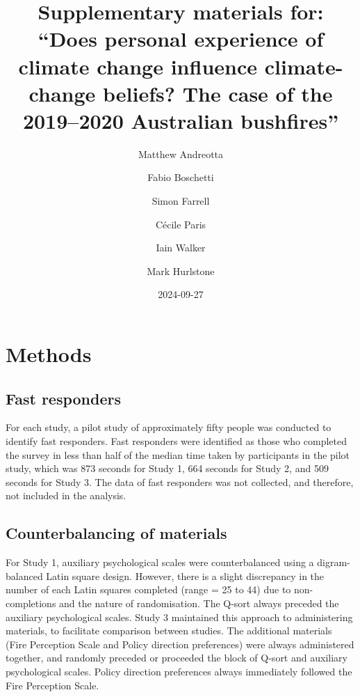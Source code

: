 \documentclass[
  letterpaper,
  DIV=11,
  numbers=noendperiod]{scrartcl}
\title{Supplementary materials for: ``Does personal experience of
climate change influence climate-change beliefs? The case of the
2019--2020 Australian bushfires''}
\author{Matthew Andreotta \and Fabio Boschetti \and Simon
Farrell \and Cécile Paris \and Iain Walker \and Mark Hurlstone}
\date{2024-09-27}
\begin{document}
\maketitle
\ifdefined\Shaded\renewenvironment{Shaded}{\begin{tcolorbox}[sharp corners, borderline west={3pt}{0pt}{shadecolor}, interior hidden, boxrule=0pt, enhanced, breakable, frame hidden]}{\end{tcolorbox}}\fi

\hypertarget{methods}{%
\section{Methods}\label{methods}}

\hypertarget{fast-responders}{%
\subsection{Fast responders}\label{fast-responders}}

For each study, a pilot study of approximately fifty people was
conducted to identify fast responders. Fast responders were identified
as those who completed the survey in less than half of the median time
taken by participants in the pilot study, which was 873 seconds for
Study 1, 664 seconds for Study 2, and 509 seconds for Study 3. The data
of fast responders was not collected, and therefore, not included in the
analysis.

\hypertarget{counterbalancing-of-materials}{%
\subsection{Counterbalancing of
materials}\label{counterbalancing-of-materials}}

For Study 1, auxiliary psychological scales were counterbalanced using a
digram-balanced Latin square design. However, there is a slight
discrepancy in the number of each Latin squares completed (range = 25 to
44) due to non-completions and the nature of randomisation. The Q-sort
always preceded the auxiliary psychological scales. Study 3 maintained
this approach to administering materials, to facilitate comparison
between studies. The additional materials (Fire Perception Scale and
Policy direction preferences) were always administered together, and
randomly preceded or proceeded the block of Q-sort and auxiliary
psychological scales. Policy direction preferences always immediately
followed the Fire Perception Scale.
\end{document}
